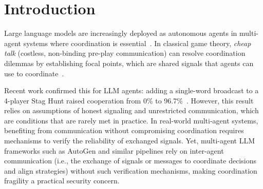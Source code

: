 \documentclass[runningheads]{llncs}
\begin{document}
\begin{abstract}







\end{abstract}

\section{Introduction}\label{sec:intro}

Large language models are increasingly deployed as autonomous agents in multi-agent systems where coordination is essential~\cite{wooldridge2009introduction,park2023generative}.
In classical game theory, \emph{cheap talk} (costless, non-binding pre-play communication) can resolve coordination dilemmas by establishing focal points, which are shared signals that agents can use to coordinate~\cite{farrell1987cheap,farrell1996cheap}.

Recent work confirmed this for LLM agents: adding a single-word broadcast to a 4-player Stag Hunt raised cooperation from 0\% to 96.7\%~\cite{madmoun2026communication}.
However, this result relies on assumptions of honest signaling and unrestricted communication, which are conditions that are rarely met in practice.
In real-world multi-agent systems, benefiting from communication without compromising coordination requires mechanisms to verify the reliability of exchanged signals.
Yet, multi-agent LLM frameworks such as AutoGen\cite{wu2023autogen} and similar pipelines rely on inter-agent communication (i.e., the exchange of signals or messages to coordinate decisions and align strategies) without such verification mechanisms, making coordination fragility a practical security concern.
\end{document}
